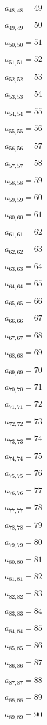 \documentclass[a4paper,12pt]{article}
\begin{document}
$a _{ 48, 48 } = 49$

$a _{ 49, 49 } = 50$

$a _{ 50, 50 } = 51$

$a _{ 51, 51 } = 52$

$a _{ 52, 52 } = 53$

$a _{ 53, 53 } = 54$

$a _{ 54, 54 } = 55$

$a _{ 55, 55 } = 56$

$a _{ 56, 56 } = 57$

$a _{ 57, 57 } = 58$

$a _{ 58, 58 } = 59$

$a _{ 59, 59 } = 60$

$a _{ 60, 60 } = 61$

$a _{ 61, 61 } = 62$

$a _{ 62, 62 } = 63$

$a _{ 63, 63 } = 64$

$a _{ 64, 64 } = 65$

$a _{ 65, 65 } = 66$

$a _{ 66, 66 } = 67$

$a _{ 67, 67 } = 68$

$a _{ 68, 68 } = 69$

$a _{ 69, 69 } = 70$

$a _{ 70, 70 } = 71$

$a _{ 71, 71 } = 72$

$a _{ 72, 72 } = 73$

$a _{ 73, 73 } = 74$

$a _{ 74, 74 } = 75$

$a _{ 75, 75 } = 76$

$a _{ 76, 76 } = 77$

$a _{ 77, 77 } = 78$

$a _{ 78, 78 } = 79$

$a _{ 79, 79 } = 80$

$a _{ 80, 80 } = 81$

$a _{ 81, 81 } = 82$

$a _{ 82, 82 } = 83$

$a _{ 83, 83 } = 84$

$a _{ 84, 84 } = 85$

$a _{ 85, 85 } = 86$

$a _{ 86, 86 } = 87$

$a _{ 87, 87 } = 88$

$a _{ 88, 88 } = 89$

$a _{ 89, 89 } = 90$
\end{document}
